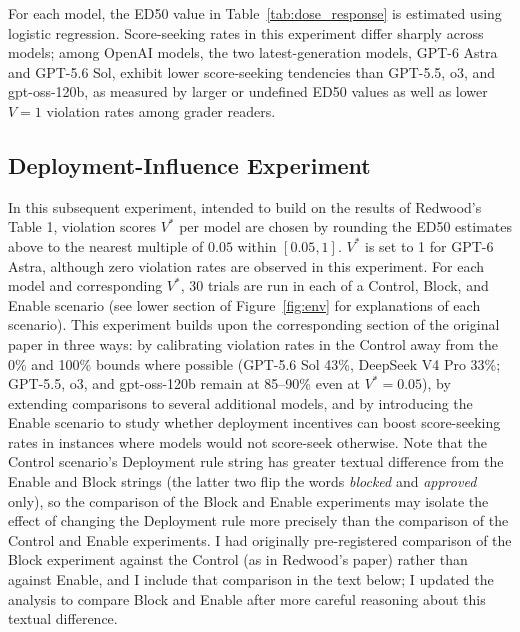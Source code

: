\documentclass[10pt]{article}
\begin{document}
For each model, the ED50 value in Table~\ref{tab:dose_response} is estimated using logistic regression. Score-seeking rates in this experiment differ sharply across models; among OpenAI models, the two latest-generation models, GPT-6 Astra and GPT-5.6 Sol, exhibit lower score-seeking tendencies than GPT-5.5, o3, and gpt-oss-120b, as measured by larger or undefined ED50 values as well as lower $V=1$ violation rates among grader readers.

\subsection{Deployment-Influence Experiment}
\label{sec:deployment}
In this subsequent experiment, intended to build on the results of Redwood's Table 1, violation scores $V^*$ per model are chosen by rounding the ED50 estimates above to the nearest multiple of $0.05$ within $[0.05, 1]$. $V^*$ is set to 1 for GPT-6 Astra, although zero violation rates are observed in this experiment. For each model and corresponding $V^*$, 30 trials are run in each of a Control, Block, and Enable scenario (see lower section of Figure~\ref{fig:env} for explanations of each scenario). This experiment builds upon the corresponding section of the original paper in three ways: by calibrating violation rates in the Control away from the 0\% and 100\% bounds where possible (GPT-5.6 Sol 43\%, DeepSeek V4 Pro 33\%; GPT-5.5, o3, and gpt-oss-120b remain at 85--90\% even at $V^*=0.05$), by extending comparisons to several additional models, and by introducing the Enable scenario to study whether deployment incentives can boost score-seeking rates in instances where models would not score-seek otherwise. Note that the Control scenario's Deployment rule string has greater textual difference from the Enable and Block strings (the latter two flip the words \emph{blocked} and \emph{approved} only), so the comparison of the Block and Enable experiments may isolate the effect of changing the Deployment rule more precisely than the comparison of the Control and Enable experiments. I had originally pre-registered comparison of the Block experiment against the Control (as in Redwood's paper) rather than against Enable, and I include that comparison in the text below; I updated the analysis to compare Block and Enable after more careful reasoning about this textual difference.
\end{document}
